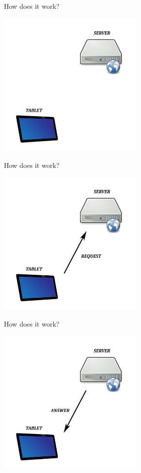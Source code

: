 \documentclass[a4paper,10pt]{beamer}
\begin{document}
			\begin{frame}{How does it work?}
				\centerline{\includegraphics[height=205pt]{images/network/tabletandserver.png}}
			\end{frame}
		
			\begin{frame}{How does it work?}
				\centerline{\includegraphics[height=205pt]{images/network/request.png}}
			\end{frame}
			
			\begin{frame}{How does it work?}
				\centerline{\includegraphics[height=205pt]{images/network/answer.png}}
			\end{frame}
			
\end{document}
